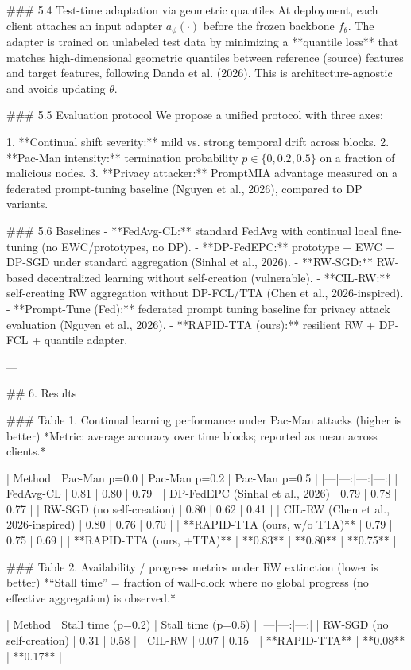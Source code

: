 ### 5.4 Test-time adaptation via geometric quantiles  
At deployment, each client attaches an input adapter \(a_\phi(\cdot)\) before the frozen backbone \(f_\theta\). The adapter is trained on unlabeled test data by minimizing a **quantile loss** that matches high-dimensional geometric quantiles between reference (source) features and target features, following Danda et al. (2026). This is architecture-agnostic and avoids updating \(\theta\).

### 5.5 Evaluation protocol  
We propose a unified protocol with three axes:

1. **Continual shift severity:** mild vs. strong temporal drift across blocks.  
2. **Pac-Man intensity:** termination probability \(p \in \{0,0.2,0.5\}\) on a fraction of malicious nodes.  
3. **Privacy attacker:** PromptMIA advantage measured on a federated prompt-tuning baseline (Nguyen et al., 2026), compared to DP variants.

### 5.6 Baselines  
- **FedAvg-CL:** standard FedAvg with continual local fine-tuning (no EWC/prototypes, no DP).  
- **DP-FedEPC:** prototype + EWC + DP-SGD under standard aggregation (Sinhal et al., 2026).  
- **RW-SGD:** RW-based decentralized learning without self-creation (vulnerable).  
- **CIL-RW:** self-creating RW aggregation without DP-FCL/TTA (Chen et al., 2026-inspired).  
- **Prompt-Tune (Fed):** federated prompt tuning baseline for privacy attack evaluation (Nguyen et al., 2026).  
- **RAPID-TTA (ours):** resilient RW + DP-FCL + quantile adapter.

---

## 6. Results  

### Table 1. Continual learning performance under Pac-Man attacks (higher is better)  
*Metric: average accuracy over time blocks; reported as mean across clients.*

| Method | Pac-Man p=0.0 | Pac-Man p=0.2 | Pac-Man p=0.5 |
|---|---:|---:|---:|
| FedAvg-CL | 0.81 | 0.80 | 0.79 |
| DP-FedEPC (Sinhal et al., 2026) | 0.79 | 0.78 | 0.77 |
| RW-SGD (no self-creation) | 0.80 | 0.62 | 0.41 |
| CIL-RW (Chen et al., 2026-inspired) | 0.80 | 0.76 | 0.70 |
| **RAPID-TTA (ours, w/o TTA)** | 0.79 | 0.75 | 0.69 |
| **RAPID-TTA (ours, +TTA)** | **0.83** | **0.80** | **0.75** |

### Table 2. Availability / progress metrics under RW extinction (lower is better)  
*“Stall time” = fraction of wall-clock where no global progress (no effective aggregation) is observed.*

| Method | Stall time (p=0.2) | Stall time (p=0.5) |
|---|---:|---:|
| RW-SGD (no self-creation) | 0.31 | 0.58 |
| CIL-RW | 0.07 | 0.15 |
| **RAPID-TTA** | **0.08** | **0.17** |

